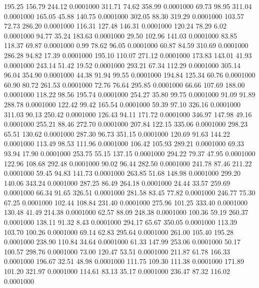 195.25  156.79  244.12   0.0001000
 311.71   74.62  358.99   0.0001000
  69.73   98.95  311.04   0.0001000
 165.05   45.88  140.75   0.0001000
 302.05   88.30  319.29   0.0001000
 103.57   72.73  286.20   0.0001000
 116.31  127.48  146.31   0.0001000
 120.24   78.29    6.02   0.0001000
  94.77   35.24  183.63   0.0001000
  29.50  102.96  141.03   0.0001000
  83.85  118.37   69.87   0.0001000
   0.99   78.62   96.05   0.0001000
  60.87   84.59  310.69   0.0001000
 286.28   94.82   17.39   0.0001000
 195.10  110.07  271.12   0.0001000
 173.83  143.01   41.93   0.0001000
 243.14   51.42   19.52   0.0001000
 293.21   67.34  112.29   0.0001000
 305.14   96.04  354.90   0.0001000
  44.38   91.94   99.55   0.0001000
 194.84  125.34   60.76   0.0001000
  60.90   80.72  261.53   0.0001000
  72.76   76.64  295.85   0.0001000
  66.66  107.69  188.00   0.0001000
 118.22   98.56  195.74   0.0001000
 254.27   35.80   99.75   0.0001000
  91.09   91.89  288.78   0.0001000
 122.42   99.42  165.54   0.0001000
  59.39   97.10  326.16   0.0001000
 311.03   90.13  250.42   0.0001000
 126.43   94.11  171.72   0.0001000
 346.97  147.98   49.16   0.0001000
 255.21   88.46  272.70   0.0001000
 207.84  122.15  335.06   0.0001000
 298.23   65.51  130.62   0.0001000
 287.30   96.73  351.15   0.0001000
 120.69   91.63  144.22   0.0001000
 113.49   98.53  111.96   0.0001000
 106.42  105.93  289.21   0.0001000
  69.33   93.94   17.90   0.0001000
 253.75   55.15  137.15   0.0001000
 294.22   79.37   47.95   0.0001000
 122.96  108.68  292.48   0.0001000
  90.02   96.44  282.50   0.0001000
 241.78   87.46  211.22   0.0001000
  59.45   94.83  141.73   0.0001000
 263.85   51.68  148.98   0.0001000
 299.20  140.06  343.24   0.0001000
 287.25   86.49  264.18   0.0001000
  24.44   33.57  259.69   0.0001000
  66.34   91.65  326.51   0.0001000
 281.58   83.45   77.82   0.0001000
 246.77   75.30   67.25   0.0001000
 102.44  108.84  231.40   0.0001000
 275.96  101.25  333.40   0.0001000
 130.48   41.49  214.38   0.0001000
  62.57   88.09  248.38   0.0001000
 100.36   59.19  260.37   0.0001000
 138.11   91.32    8.43   0.0001000
 294.17   65.67  350.05   0.0001000
 113.39  103.70  100.26   0.0001000
  69.14   62.83  295.64   0.0001000
 261.00  105.40  195.28   0.0001000
 238.90  110.84   34.64   0.0001000
  61.33  147.99  253.06   0.0001000
  50.17  100.57  298.76   0.0001000
  73.00  120.47   53.51   0.0001000
 211.87   61.78  166.33   0.0001000
 196.67   32.51   48.98   0.0001000
 111.75  109.30  111.38   0.0001000
 171.89  101.20  321.97   0.0001000
 114.61   83.13   35.17   0.0001000
 236.47   87.32  116.02   0.0001000
